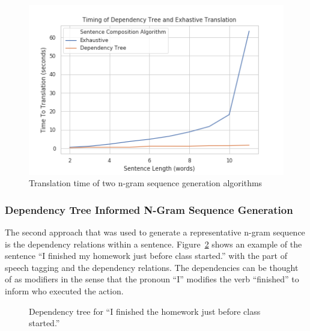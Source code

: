 \documentclass{article}[10]
\begin{document}
\begin{figure}[H]
  \begin{center}
    \includegraphics[width=\columnwidth]{figures/timing.png}
    \caption{Translation time of two n-gram sequence generation
      algorithms\label{fig:timing}}
  \end{center}
\end{figure}

\subsubsection{Dependency Tree Informed N-Gram Sequence Generation\label{sec:dependency}}

The second approach that was used to generate a representative n-gram sequence is the dependency relations within a sentence. Figure~\ref{fig:dep} shows an example of the sentence ``I finished my homework just before class started.'' with the part of speech tagging and the dependency relations. The dependencies can be thought of as modifiers in the sense that the pronoun ``I'' modifies the verb ``finished'' to inform who executed the action.

\begin{figure}[H]
  \begin{center}
    \caption{Dependency tree for ``I finished the homework just before class
      started.''\label{fig:dep}}
  \end{center}
\end{figure}
\end{document}
